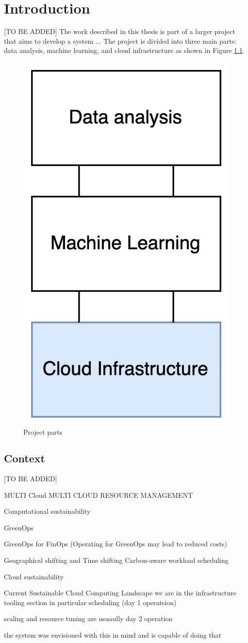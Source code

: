 \chapter{Introduction}
\label{cha:introduction}


[TO BE ADDED]
The work described in this thesis is part of a larger project that aims to develop a system ... 
The project is divided into three main parts: data analysis, machine learning, and cloud infrastructure as shown in Figure \ref{fig:project_parts}.

\begin{figure}[htb]
    \centering
    \includegraphics[width=0.25\linewidth]{images/project_parts.png}
    \caption{Project parts}
    \label{fig:project_parts}
\end{figure}

\section{Context}
\label{sec:context}

[TO BE ADDED]

MULTI Cloud
MULTI CLOUD RESOURCE MANAGEMENT


Computational sustainability

GreenOps

GreenOps for FinOps
(Operating for GreenOps may lead to reduced costs)

Geographical shifting and Time shifting
Carbon-aware workload scheduling


Cloud sustainability

Current Sustainable Cloud Computing Landscape
we are in the infrastructure tooling section
in particular scheduling (day 1 operatsion)

scaling and resource tuning are usuaully day 2 operation

the system was envisioned with this in mind and is capable of doing that


